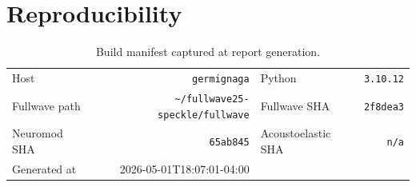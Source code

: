 \documentclass[11pt,letterpaper]{article}
\begin{document}
\section{Reproducibility}\label{sec:repro}
\begin{table}[h!]
\centering
\scriptsize
\setlength{\tabcolsep}{6pt}
\begin{tabular}{lr|lr}
\toprule
Host                & \texttt{germignaga} & Python              & \texttt{3.10.12} \\
Fullwave path       & \texttt{\textasciitilde{}/fullwave25-speckle/fullwave} & Fullwave SHA        & \texttt{2f8dea3} \\
Neuromod SHA        & \texttt{65ab845} & Acoustoelastic SHA  & \texttt{n/a} \\
Generated at        & 2026-05-01T18:07:01-04:00 & & \\
\bottomrule
\end{tabular}
\caption{Build manifest captured at report generation.}
\end{table}
\end{document}
